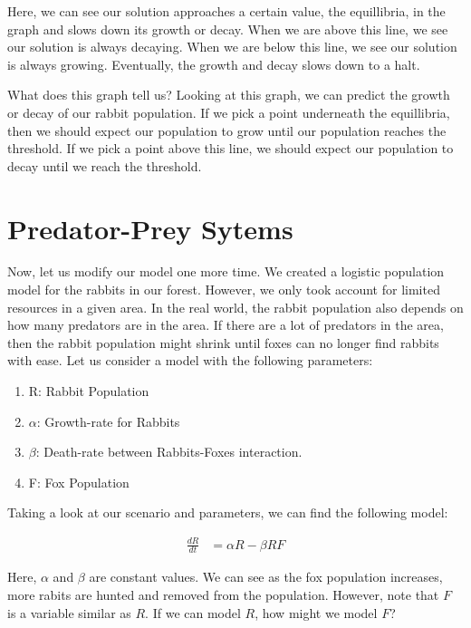 \documentclass{amsart}
\theoremstyle{definition}
\numberwithin{equation}{section}
\begin{document}
\begin{sansmath}

Here, we can see our solution approaches a certain value, the equillibria, in the graph and slows down its growth or decay. When we are above this line, we see our solution is always decaying. When we are below this line, we see our solution is always growing. Eventually, the growth and decay slows down to a halt.

What does this graph tell us? Looking at this graph, we can predict the growth or decay of our rabbit population. If we pick a point underneath the equillibria, then we should expect our population to grow until our population reaches the threshold. If we pick a point above this line, we should expect our population to decay until we reach the threshold.


\section{Predator-Prey Sytems}

Now, let us modify our model one more time. We created a logistic population model for the rabbits in our forest. However, we only took account for limited resources in a given area. In the real world, the rabbit population also depends on how many predators are in the area. If there are a lot of predators in the area, then the rabbit population might shrink until foxes can no longer find rabbits with ease. Let us consider a model with the following parameters:
\begin{enumerate}
  \item R: Rabbit Population
  \item $\alpha$: Growth-rate for Rabbits
  \item $\beta$: Death-rate between Rabbits-Foxes interaction.
  \item F: Fox Population
\end{enumerate}

Taking a look at our scenario and parameters, we can find the following model:

\begin{align*}
  \frac{dR}{dt} & = \alpha R - \beta RF
\end{align*}

Here, $\alpha$ and $\beta$ are constant values. We can see as the fox population increases, more rabits are hunted and removed from the population. However, note that $F$ is a variable similar as $R$. If we can model $R$, how might we model $F$?


\end{sansmath}
\end{document}
